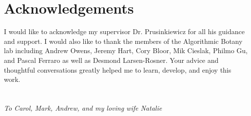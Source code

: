\documentclass{thesis}
\theoremstyle{plain}
\theoremstyle{definition}
\begin{document}

  \begin{thesisabstract}  
  \end{thesisabstract}


  \chapter{Acknowledgements}  
  
I would like to acknowledge my supervisor Dr. Prusinkiewicz for all his guidance and support. I would also like to thank the members of the Algorithmic Botany lab including Andrew Owens, Jeremy Hart, Cory Bloor, Mik Cieslak, Philmo Gu, and Pascal Ferraro as well as Desmond Larsen-Rosner. Your advice and thoughtful conversations greatly helped me to learn, develop, and enjoy this work.
    

  \chapter[Dedication]{}
  
  \begin{dedication}
     \emph{To Carol, Mark, Andrew, and my loving wife Natalie}
  \end{dedication}

\end{document}
